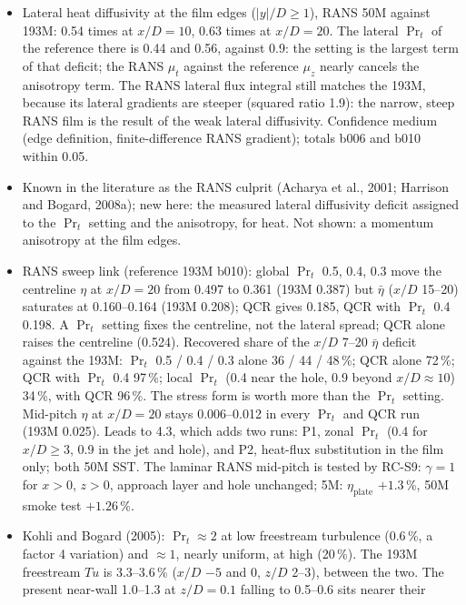 \documentclass[10pt]{article}
\begin{document}
\begin{itemize}
  $\nu_y/\nu_z$ is about 1 on the flanks (0.7--1.1); the heat anisotropy does not follow from the momentum.
\item Lateral heat diffusivity at the film edges ($|y|/D\ge1$), RANS 50M against 193M: 0.54 times at $x/D=10$,
  0.63 times at $x/D=20$. The lateral $\Pr_t$ of the reference there is 0.44 and 0.56, against 0.9: the setting
  is the largest term of that deficit; the RANS $\mu_t$ against the reference $\mu_z$ nearly cancels the
  anisotropy term. The RANS lateral flux integral still matches the 193M, because its lateral gradients are
  steeper (squared ratio 1.9): the narrow, steep RANS film is the result of the weak lateral diffusivity.
  Confidence medium (edge definition, finite-difference RANS gradient); totals b006 and b010 within 0.05.
\item Known in the literature as the RANS culprit (Acharya et al., 2001; Harrison and Bogard, 2008a); new here:
  the measured lateral diffusivity deficit assigned to the $\Pr_t$ setting and the anisotropy, for heat. Not shown:
  a momentum anisotropy at the film edges.
\item RANS sweep link (reference 193M b010): global $\Pr_t$ 0.5, 0.4,
  0.3 move the centreline $\eta$ at $x/D=20$ from 0.497 to 0.361 (193M 0.387) but $\bar\eta$ ($x/D$ 15--20)
  saturates at 0.160--0.164 (193M 0.208); QCR gives 0.185, QCR with $\Pr_t$ 0.4 0.198. A $\Pr_t$ setting fixes the
  centreline, not the lateral spread; QCR alone raises the centreline (0.524). Recovered share of the $x/D$ 7--20
  $\bar\eta$ deficit against the 193M: $\Pr_t$ 0.5 / 0.4 / 0.3 alone 36 / 44 / 48\,\%; QCR alone 72\,\%; QCR with
  $\Pr_t$ 0.4 97\,\%; local $\Pr_t$ (0.4 near the hole, 0.9 beyond $x/D\approx10$) 34\,\%, with QCR 96\,\%. The
  stress form is worth more than the $\Pr_t$ setting. Mid-pitch $\eta$ at $x/D=20$ stays 0.006--0.012 in every
  $\Pr_t$ and QCR run (193M 0.025). Leads to 4.3, which adds two runs: P1, zonal
  $\Pr_t$ (0.4 for $x/D\ge3$, 0.9 in the jet and hole), and P2, heat-flux substitution in the film only; both
  50M SST. The laminar RANS mid-pitch is tested by RC-S9: $\gamma=1$ for
  $x>0$, $z>0$, approach layer and hole unchanged; 5M: $\eta_{\mathrm{plate}}$ $+1.3$\,\%, 50M smoke test $+1.26$\,\%.
\item Kohli and Bogard (2005): $\Pr_t\approx2$ at low freestream turbulence (0.6\,\%, a factor 4 variation) and
  $\approx1$, nearly uniform, at high (20\,\%). The 193M freestream $Tu$ is 3.3--3.6\,\% ($x/D$ $-5$ and 0,
  $z/D$ 2--3), between the two. The present near-wall 1.0--1.3 at $z/D=0.1$ falling to 0.5--0.6 sits nearer their

\end{itemize}
\end{document}
